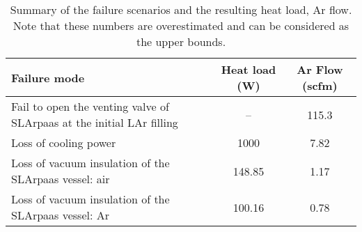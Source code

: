 \begin{table}[h]
\begin{center}
\tabcolsep=10pt
\begin{tabular}{m{8cm}|c|c}
\hline
\hline
Failure mode & Heat load (W) & Ar Flow (scfm) \\
\hline
Fail to open the venting valve of SLArpaas at the initial LAr filling & -- & 115.3 \\
Loss of cooling power & 1000 & 7.82 \\
Loss of vacuum insulation of the SLArpaas vessel: air & 148.85 & 1.17 \\
Loss of vacuum insulation of the SLArpaas vessel: Ar & 100.16 & 0.78 \\
\hline
\hline
\end{tabular}
\caption{Summary of the failure scenarios and the resulting heat load, Ar flow.
Note that these numbers are overestimated and can be considered as the upper bounds.}
\label{table:discharge_summary}
\end{center}
\end{table}
